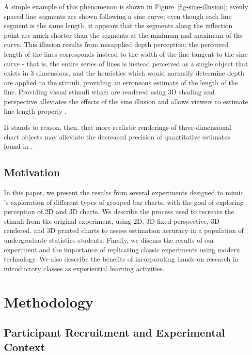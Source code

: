\documentclass[runningheads
]{llncs}
\begin{document}
A simple example of this phenomenon is shown in
Figure~\ref{fig-sine-illusion}; evenly spaced line segments are shown
following a sine curve; even though each line segment is the same
length, it appears that the segments along the inflection point are much
shorter than the segments at the minimum and maximum of the curve. This
illusion results from misapplied depth perception; the perceived length
of the lines corresponds instead to the width of the line tangent to the
sine curve - that is, the entire series of lines is instead perceived as
a single object that exists in 3 dimensions, and the heuristics which
would normally determine depth are applied to the stimuli, providing an
erroneous estimate of the length of the line. Providing visual stimuli
which are rendered using 3D shading and perspective alleviates the
effects of the sine illusion and allows viewers to estimate line length
properly \autocite[Fig 3]{vanderplasSignsSineIllusion2015}.

It stands to reason, then, that more realistic renderings of
three-dimensional chart objects may alleviate the decreased precision of
quantitative estimates found in
\textcite{clevelandGraphicalPerceptionTheory1984}.

\subsection{Motivation}\label{motivation}

In this paper, we present the results from several experiments designed
to mimic \textcite{clevelandGraphicalPerceptionTheory1984}'s exploration
of different types of grouped bar charts, with the goal of exploring
perception of 2D and 3D charts. We describe the process used to recreate
the stimuli from the original experiment, using 2D, 3D fixed
perspective, 3D rendered, and 3D printed charts to assess estimation
accuracy in a population of undergraduate statistics students. Finally,
we discuss the results of our experiment and the importance of
replicating classic experiments using modern technology. We also
describe the benefits of incorporating hands-on research in introductory
classes as experiential learning activities.

\section{Methodology}\label{methodology}

\subsection{Participant Recruitment and Experimental
Context}\label{participant-recruitment-and-experimental-context}
\end{document}
